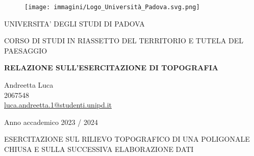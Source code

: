 \begin{figure}[H]\centering
    \texttt{[image: immagini/Logo\_Università\_Padova.svg.png]}
\end{figure}
\begin{center}

{\Large UNIVERSITA' DEGLI STUDI DI PADOVA }\\
  \vspace{0.4 cm}
  
{\Large CORSO DI STUDI IN RIASSETTO DEL TERRITORIO E TUTELA DEL PAESAGGIO } \\ 
    \vspace{0.4 cm}
    
    \vspace{1 cm}
{\huge \textbf{RELAZIONE SULL'ESERCITAZIONE DI TOPOGRAFIA} }

\vspace{0.75 cm}

\normalsize
\end{center}

{\Large \begin{center}
Andreetta Luca \\
2067548 \\
\href{mailto:luca.andreetta.1@studenti.unipd.it}{luca.andreetta.1@studenti.unipd.it}
\end{center}
\vspace{1 cm}

\thispagestyle{empty}
\begin{center}
	Anno accademico 2023 / 2024
\end{center}

\vspace{2 cm}
\begin{center}
    ESERCITAZIONE SUL RILIEVO TOPOGRAFICO DI UNA POLIGONALE CHIUSA E SULLA SUCCESSIVA ELABORAZIONE DATI
\end{center}
}
\newpage
